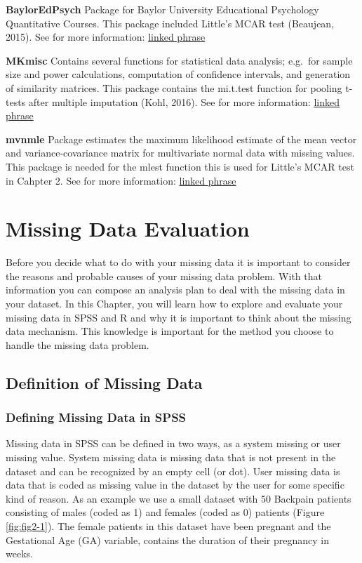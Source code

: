 \documentclass[]{book}
\theoremstyle{definition}
\theoremstyle{definition}
\theoremstyle{definition}
\theoremstyle{remark}
\begin{document}
\textbf{BaylorEdPsych} Package for Baylor University Educational
Psychology Quantitative Courses. This package included Little's MCAR
test (Beaujean, 2015). See for more information:
\href{https://cran.r-project.org/web/packages/BaylorEdPsych/index.html}{linked
phrase}

\textbf{MKmisc} Contains several functions for statistical data
analysis; e.g.~for sample size and power calculations, computation of
confidence intervals, and generation of similarity matrices. This
package contains the mi.t.test function for pooling t-tests after
multiple imputation (Kohl, 2016). See for more information:
\href{https://cran.r-project.org/web/packages/MKmisc/index.html}{linked
phrase}

\textbf{mvnmle} Package estimates the maximum likelihood estimate of the
mean vector and variance-covariance matrix for multivariate normal data
with missing values. This package is needed for the mlest function this
is used for Little's MCAR test in Cahpter 2. See for more information:
\href{https://cran.r-project.org/web/packages/mvnmle/index.html}{linked
phrase}

\chapter{Missing Data Evaluation}\label{missing-data-evaluation}

Before you decide what to do with your missing data it is important to
consider the reasons and probable causes of your missing data problem.
With that information you can compose an analysis plan to deal with the
missing data in your dataset. In this Chapter, you will learn how to
explore and evaluate your missing data in SPSS and R and why it is
important to think about the missing data mechanism. This knowledge is
important for the method you choose to handle the missing data problem.

\section{Definition of Missing Data}\label{definition-of-missing-data}

\subsection{Defining Missing Data in
SPSS}\label{defining-missing-data-in-spss}

Missing data in SPSS can be defined in two ways, as a system missing or
user missing value. System missing data is missing data that is not
present in the dataset and can be recognized by an empty cell (or dot).
User missing data is data that is coded as missing value in the dataset
by the user for some specific kind of reason. As an example we use a
small dataset with 50 Backpain patients consisting of males (coded as 1)
and females (coded as 0) patients (Figure \ref{fig:fig2-1}). The female
patients in this dataset have been pregnant and the Gestational Age (GA)
variable, contains the duration of their pregnancy in weeks.
\end{document}
